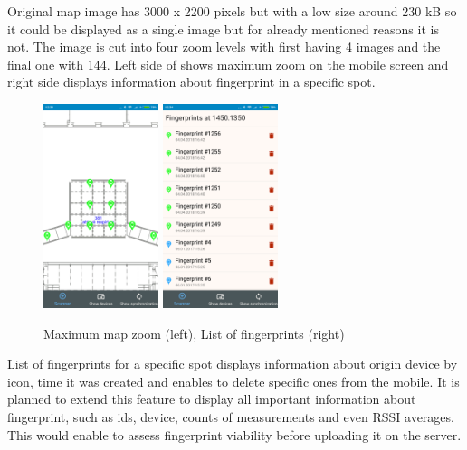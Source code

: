 Original map image has 3000 x 2200 pixels but with a low size around 230 kB so it could be displayed as a single image but for already mentioned reasons it is not. The image is cut into four zoom levels with first having 4 images and the final one with 144. Left side of  shows maximum zoom on the mobile screen and right side displays information about fingerprint in a specific spot.

\begin{figure}[h!]
	\begin{centering}
		\includegraphics[width=0.30\textwidth]{img/map_zoom}
		\includegraphics[width=0.30\textwidth]{img/map_list_fingerprints}
		\par\end{centering}
	\caption{Maximum map zoom (left), List of fingerprints (right)\label{fig:map_zoom_and_list}}
	\label{fig06c05}
\end{figure}

List of fingerprints for a specific spot displays information about origin device by icon, time it was created and enables to delete specific ones from the mobile. It is planned to extend this feature to display all important information about fingerprint, such as ids, device, counts of measurements and even RSSI averages. This would enable to assess fingerprint viability before uploading it on the server.

